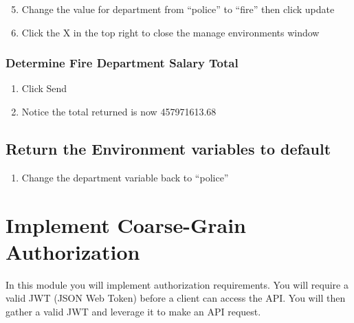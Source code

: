 \documentclass[letterpaper,10pt,english]{sphinxmanual}
\begin{document}
\begin{enumerate}
\setcounter{enumi}{4}
\item {} 
Change the value for department from “police” to “fire” then click
update

\end{enumerate}
\begin{quote}

\noindent{}
\end{quote}
\begin{enumerate}
\setcounter{enumi}{5}
\item {} 
Click the X in the top right to close the manage environments window

\end{enumerate}
\begin{quote}

\noindent{}
\end{quote}


\subsubsection{Determine Fire Department Salary Total}
\label{\detokenize{class1/module1/module1:determine-fire-department-salary-total}}\begin{enumerate}
\item {} 
Click Send

\item {} 
Notice the total returned is now 457971613.68

\end{enumerate}


\subsection{Return the Environment variables to default}
\label{\detokenize{class1/module1/module1:return-the-environment-variables-to-default}}\begin{enumerate}
\item {} 
Change the department variable back to “police”

\end{enumerate}


\section{Implement Coarse-Grain Authorization}
\label{\detokenize{class1/module2/module2::doc}}\label{\detokenize{class1/module2/module2:implement-coarse-grain-authorization}}
In this module you will implement authorization requirements. You will
require a valid JWT (JSON Web Token) before a client can access the API.
You will then gather a valid JWT and leverage it to make an API request.
\end{document}

